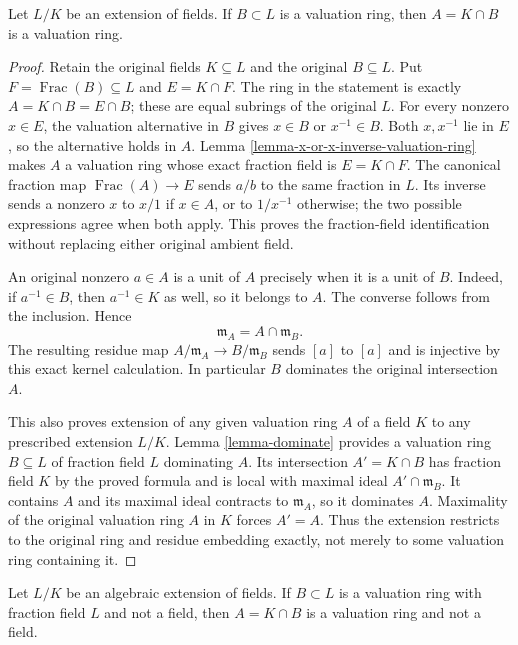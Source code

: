 \begin{lemma}
\label{lemma-valuation-ring-cap-field}
Let $L/K$ be an extension of fields. If $B \subset L$
is a valuation ring, then $A = K \cap B$ is a valuation ring.
\end{lemma}

\begin{proof}
Retain the original fields $K\subseteq L$
and the original $B\subseteq L$.
Put $F=\operatorname{Frac}(B)\subseteq L$
and $E=K\cap F$. The ring in
the statement is exactly
$A=K\cap B=E\cap B$; these
are equal subrings of the
original $L$. For every
nonzero $x\in E$, the
valuation alternative in $B$
gives $x\in B$ or $x^{-1}\in B$.
Both $x,x^{-1}$ lie in $E$,
so the alternative holds in
$A$. Lemma
\ref{lemma-x-or-x-inverse-valuation-ring}
makes $A$ a valuation ring
whose exact fraction field
is $E=K\cap F$.
The canonical fraction map
$\operatorname{Frac}(A)\to E$
sends $a/b$ to the same
fraction in $L$. Its inverse
sends a nonzero $x$ to
$x/1$ if $x\in A$, or
to $1/x^{-1}$ otherwise;
the two possible expressions
agree when both apply.
This proves the fraction-field
identification without replacing
either original ambient field.

An original nonzero $a\in A$
is a unit of $A$ precisely
when it is a unit of $B$.
Indeed, if $a^{-1}\in B$,
then $a^{-1}\in K$ as well,
so it belongs to $A$.
The converse follows from
the inclusion. Hence
$$
\mathfrak m_A=A\cap\mathfrak m_B.
$$
The resulting residue map
$A/\mathfrak m_A\to B/\mathfrak m_B$
sends $[a]$ to $[a]$ and
is injective by this exact
kernel calculation. In particular
$B$ dominates the original
intersection $A$.

This also proves extension
of any given valuation ring
$A$ of a field $K$ to
any prescribed extension $L/K$.
Lemma \ref{lemma-dominate}
provides a valuation ring
$B\subseteq L$ of fraction
field $L$ dominating $A$.
Its intersection $A'=K\cap B$
has fraction field $K$ by
the proved formula and is
local with maximal ideal
$A'\cap\mathfrak m_B$.
It contains $A$ and its
maximal ideal contracts to
$\mathfrak m_A$, so it
dominates $A$. Maximality
of the original valuation
ring $A$ in $K$ forces
$A'=A$. Thus the extension
restricts to the original
ring and residue embedding
exactly, not merely to some
valuation ring containing it.
\end{proof}

\begin{lemma}
\label{lemma-valuation-ring-cap-field-finite}
Let $L/K$ be an algebraic extension of fields. If $B \subset L$
is a valuation ring with fraction field $L$ and not a field, then
$A = K \cap B$ is a valuation ring and not a field.
\end{lemma}

